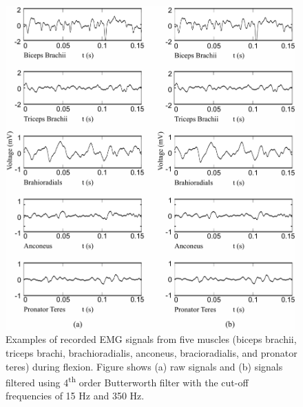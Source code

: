 \begin{figure}[ht]
\centering
\includegraphics[width=0.99\textwidth]{Images/figure3_B2.png}
\caption{Examples of recorded EMG signals from five muscles (biceps brachii, triceps brachi, brachioradialis, anconeus, bracioradialis, and pronator teres) during flexion. Figure shows (a) raw signals and (b) signals filtered using 4\textsuperscript{th} order Butterworth filter with the cut-off frequencies of 15 Hz and 350 Hz.}
\label{fig:3-B2}
\end{figure}   

